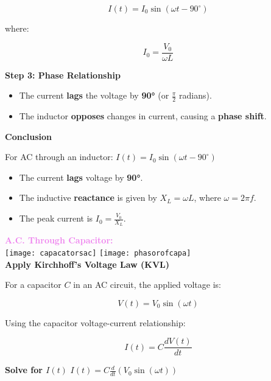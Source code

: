 \documentclass{beamer}
\begin{document}
\begin{frame}


\[
I(t) = I_0 \sin(\omega t - 90^\circ)
\]

where:

\[
I_0 = \frac{V_0}{\omega L}
\]

\textbf{Step 3: Phase Relationship}

\begin{itemize}
    \item The current \textbf{lags} the voltage by \textbf{90°} (or \( \frac{\pi}{2} \) radians).
    \item The inductor \textbf{opposes} changes in current, causing a \textbf{phase shift}.
\end{itemize}

\textbf{Conclusion}

For AC through an inductor: $I(t) = I_0 \sin(\omega t - 90^\circ)$

\begin{itemize}
    \item The current \textbf{lags} voltage by \textbf{90°}.
    \item The inductive \textbf{reactance} is given by \( X_L = \omega L \), where \( \omega = 2\pi f \).
    \item The peak current is \( I_0 = \frac{V_0}{X_L} \).
		\end{itemize}

\end{frame}

\begin{frame}
\textcolor{violet}{\textbf{A.C. Through Capacitor:}}\\
\texttt{[image: capacatorsac]}
\texttt{[image: phasorofcapa]}\\

\textbf{Apply Kirchhoff’s Voltage Law (KVL)}

For a capacitor \( C \) in an AC circuit, the applied voltage is:

\[
V(t) = V_0 \sin(\omega t)
\]

Using the capacitor voltage-current relationship:

\[
I(t) = C \frac{dV(t)}{dt}
\]

\textbf{Solve for \( I(t) \)} \hspace{2cm} $I(t) = C \frac{d}{dt} \left( V_0 \sin(\omega t) \right)$



\end{frame}
\end{document}
